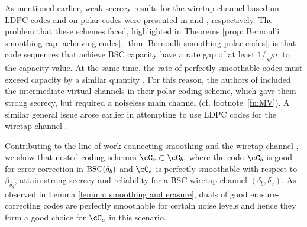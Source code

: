 \documentclass{amsart}
\theoremstyle{remark}
\begin{document}
As mentioned earlier, weak secrecy results for the wiretap channel based on LDPC codes and on polar codes were presented in \cite{thangaraj2007applications} and \cite{mahdavifar2011achieving}, respectively. The problem that these schemes faced, highlighted in Theorems \ref{prop: Bernoulli smoothing cap.-achieving codes}, \ref{thm: Bernoulli smoothing polar codes}, is that code sequences that achieve BSC capacity have a rate gap of at least $1/\sqrt n$ to the capacity value. At the same time, the rate of perfectly smoothable codes must exceed capacity by a similar quantity \cite{Watanabe2014}. For this reason, the authors of \cite{mahdavifar2011achieving} included the intermediate virtual channels in their polar coding scheme, which gave them strong secrecy, but required a noiseless main channel (cf. footnote~\ref{fn:MV}). A similar general 
issue arose earlier in attempting to use LDPC codes for the wiretap channel  \cite{Subramanian2010}. 

Contributing to the line of work connecting smoothing and the wiretap channel
\cite{hayashi2006general,bloch2013strong,yu2018renyi}, we show that nested coding schemes $\cC_e\subset \cC_b,$ where 
the code $\cC_b$ is good for error correction in ${\text{\rm BSC}}(\delta_b)$ and $\cC_e$ is perfectly smoothable with respect to $\beta_{\delta_b}$, attain strong secrecy and reliability for a BSC wiretap channel $(\delta_b,\delta_e)$.
As observed in Lemma \ref{lemma: smoothing and erasure}, 
duals of good erasure-correcting codes are perfectly smoothable for certain noise levels and hence they form a good choice for $\cC_e$ in this scenario. 
\end{document}
